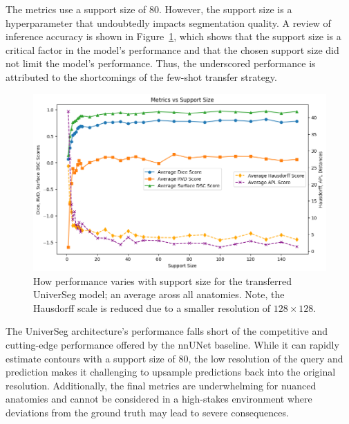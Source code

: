 \documentclass[11pt,twoside]{report}
\begin{document}
The metrics use a support size of 80. However, the support size is a hyperparameter that undoubtedly impacts segmentation quality. A review of inference accuracy is shown in Figure~\ref{fig:universeg-support-size}, which shows that the support size is a critical factor in the model's performance and that the chosen support size did not limit the model's performance. Thus, the underscored performance is attributed to the shortcomings of the few-shot transfer strategy.

\begin{figure}[H]
  \centering
  \includegraphics[width=.7\linewidth]{../../research/source/code/UniverSeg/support_size_metric_implications_universeg.png}
  \caption{How performance varies with support size for the transferred UniverSeg model; an average aross all anatomies. Note, the Hausdorff scale is reduced due to a smaller resolution of $128\times 128$.}\label{fig:universeg-support-size}
\end{figure}


The UniverSeg architecture's performance falls short of the competitive and cutting-edge performance offered by the nnUNet baseline. While it can rapidly estimate contours with a support size of 80, the low resolution of the query and prediction makes it challenging to upsample predictions back into the original resolution. Additionally, the final metrics are underwhelming for nuanced anatomies and cannot be considered in a high-stakes environment where deviations from the ground truth may lead to severe consequences.
\end{document}
